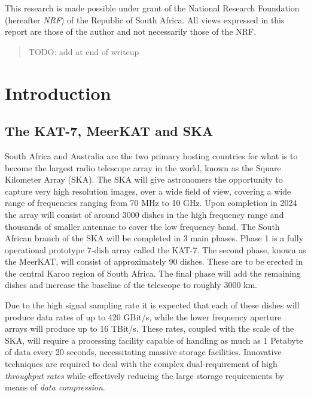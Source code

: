 This research is made possible under grant of the National Research Foundation (hereafter \textit{NRF}) of the Republic of South Africa. All views expressed in this report are those of the author and not 
necessarily those of the NRF.
\pagebreak
\begin{abstract}
 {\color{red}TODO: add at end of writeup}
\end{abstract}
\pagebreak
\tableofcontents
\pagebreak
\section{Introduction}
\subsection{The KAT-7, MeerKAT and SKA}
South Africa and Australia are the two primary hosting countries for what is to become the largest radio telescope array in the world, known as the Square Kilometer Array (SKA). 
The SKA will give astronomers the opportunity to capture very high resolution images, over a wide field of view, covering a wide range of frequencies ranging 
from 70 MHz to 10 GHz. Upon completion in 2024 the array will consist of around 3000 dishes in the high frequency range and thousands of smaller antennae to 
cover the low frequency band. The South African branch of the SKA will be completed in 3 main phases. Phase 1 is a fully operational prototype 7-dish array 
called the KAT-7. The second phase, known as the MeerKAT, will consist of approximately 90 dishes. These are to be erected in the central Karoo region of South Africa. 
The final phase will add the remaining dishes and increase the baseline of the telescope to roughly 3000 km.

Due to the high signal sampling rate it is expected that each of these dishes will produce data rates of up to 420 GBit/s, while the lower frequency aperture arrays 
will produce up to 16 TBit/s. These rates, coupled with the scale of the SKA, will require a processing facility capable of handling as much as 1 Petabyte of 
data every 20 seconds, necessitating massive storage facilities. Innovative techniques are required to deal with the complex dual-requirement of high 
\textit{throughput rates} while effectively reducing the large storage requirements by means of \textit{data compression}. 
